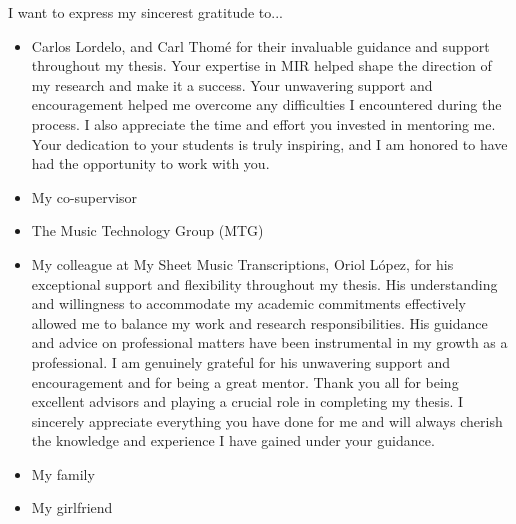 

\begin{acknowledgement}

I want to express my sincerest gratitude to...

\begin{itemize}
\item Carlos Lordelo, and Carl Thomé for their invaluable guidance and support throughout my thesis. Your expertise in MIR helped shape the direction of my research and make it a success. Your unwavering support and encouragement helped me overcome any difficulties I encountered during the process. I also appreciate the time and effort you invested in mentoring me. Your dedication to your students is truly inspiring, and I am honored to have had the opportunity to work with you.
\vspace*{3mm}
\item My co-supervisor
\vspace*{3mm}
\item The Music Technology Group (MTG)
\vspace*{3mm}
\item My colleague at My Sheet Music Transcriptions, Oriol López, for his exceptional support and flexibility throughout my thesis. His understanding and willingness to accommodate my academic commitments effectively allowed me to balance my work and research responsibilities. His guidance and advice on professional matters have been instrumental in my growth as a professional. I am genuinely grateful for his unwavering support and encouragement and for being a great mentor.
\vspace*{3mm}
Thank you all for being excellent advisors and playing a crucial role in completing my thesis. I sincerely appreciate everything you have done for me and will always cherish the knowledge and experience I have gained under your guidance.
\vspace*{3mm}
\item My family
\vspace*{3mm}
\item My girlfriend
\vspace*{3mm}
\end{itemize}

\newpage
\end{acknowledgement}